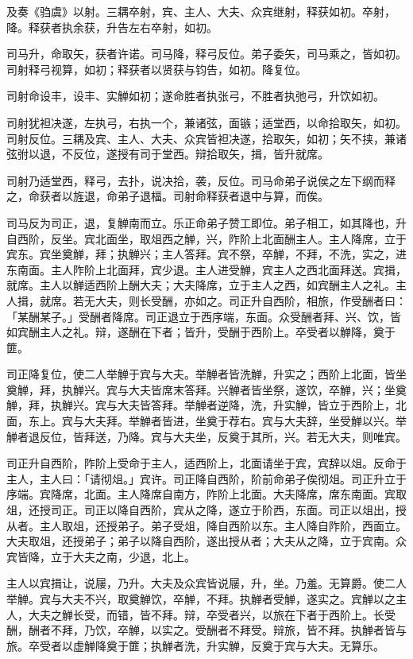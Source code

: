 \documentclass[]{article}
\begin{document}
及奏《驺虞》以射。三耦卒射，宾、主人、大夫、众宾继射，释获如初。卒射，降。释获者执余获，升告左右卒射，如初。

司马升，命取矢，获者许诺。司马降，释弓反位。弟子委矢，司马乘之，皆如初。司射释弓视算，如初；释获者以贤获与钧告，如初。降复位。

司射命设丰，设丰、实觯如初；遂命胜者执张弓，不胜者执弛弓，升饮如初。

司射犹袒决遂，左执弓，右执一个，兼诸弦，面镞；适堂西，以命拾取矢，如初。司射反位。三耦及宾、主人、大夫、众宾皆袒决遂，拾取矢，如初；矢不挟，兼诸弦弣以退，不反位，遂授有司于堂西。辩拾取矢，揖，皆升就席。

司射乃适堂西，释弓，去扑，说决拾，袭，反位。司马命弟子说侯之左下纲而释之，命获者以旌退，命弟子退楅。司射命释获者退中与算，而俟。

司马反为司正，退，复觯南而立。乐正命弟子赞工即位。弟子相工，如其降也，升自西阶，反坐。宾北面坐，取俎西之觯，兴，阼阶上北面酬主人。主人降席，立于宾东。宾坐奠觯，拜；执觯兴；主人答拜。宾不祭，卒觯，不拜，不洗，实之，进东南面。主人阼阶上北面拜，宾少退。主人进受觯，宾主人之西北面拜送。宾揖，就席。主人以觯适西阶上酬大夫；大夫降席，立于主人之西，如宾酬主人之礼。主人揖，就席。若无大夫，则长受酬，亦如之。司正升自西阶，相旅，作受酬者曰：「某酬某子。」受酬者降席。司正退立于西序端，东面。众受酬者拜、兴、饮，皆如宾酬主人之礼。辩，遂酬在下者；皆升，受酬于西阶上。卒受者以觯降，奠于篚。

司正降复位，使二人举觯于宾与大夫。举觯者皆洗觯，升实之；西阶上北面，皆坐奠觯，拜，执觯兴。宾与大夫皆席末答拜。兴觯者皆坐祭，遂饮，卒觯，兴；坐奠觯，拜，执觯兴。宾与大夫皆答拜。举觯者逆降，洗，升实觯，皆立于西阶上，北面，东上。宾与大夫拜。举觯者皆进，坐奠于荐右。宾与大夫辞，坐受觯以兴。举觯者退反位，皆拜送，乃降。宾与大夫坐，反奠于其所，兴。若无大夫，则唯宾。

司正升自西阶，阼阶上受命于主人，适西阶上，北面请坐于宾，宾辞以俎。反命于主人，主人曰：「请彻俎。」宾许。司正降自西阶，阶前命弟子俟彻俎。司正升立于序端。宾降席，北面。主人降席自南方，阼阶上北面。大夫降席，席东南面。宾取俎，还授司正。司正以降自西阶，宾从之降，遂立于阶西，东面。司正以俎出，授从者。主人取俎，还授弟子。弟子受俎，降自西阶以东。主人降自阼阶，西面立。大夫取俎，还授弟子；弟子以降自西阶，遂出授从者；大夫从之降，立于宾南。众宾皆降，立于大夫之南，少退，北上。

主人以宾揖让，说屦，乃升。大夫及众宾皆说屦，升，坐。乃羞。无算爵。使二人举觯。宾与大夫不兴，取奠觯饮，卒觯，不拜。执觯者受觯，遂实之。宾觯以之主人，大夫之觯长受，而错，皆不拜。辩，卒受者兴，以旅在下者于西阶上。长受酬，酬者不拜，乃饮，卒觯，以实之。受酬者不拜受。辩旅，皆不拜。执觯者皆与旅。卒受者以虚觯降奠于篚；执觯者洗，升实觯，反奠于宾与大夫。无算乐。
\end{document}
